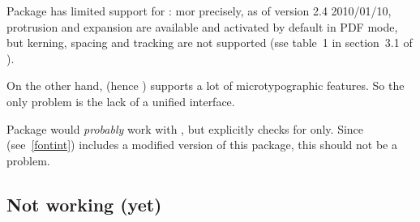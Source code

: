 \documentclass{lltxdoc}
\begin{document}
Package  has limited support for \luatex: mor precisely, as of
version 2.4 2010/01/10, protrusion and expansion are available and activated
by default in PDF mode, but kerning, spacing and tracking are not supported
(sse table~1 in section~3.1 of ).

On the other hand,  (hence ) supports a lot of
microtypographic features. So the only problem is the lack of a unified
interface.

Package  would \emph{probably} work with \luatex, but explicitly
checks for \xetex only. Since  (see~\ref{fontint}) includes a
modified version of this package, this should not be a problem.

\subsection{Not working (yet)}
\end{document}
